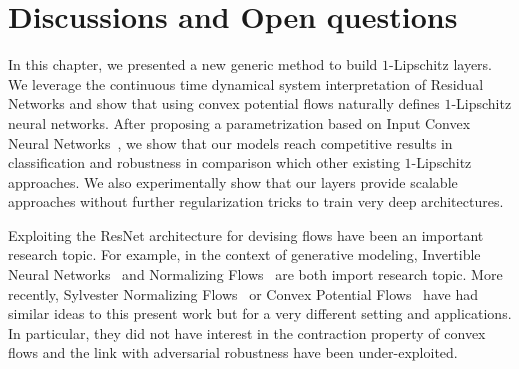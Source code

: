\section{Discussions and Open questions}
In this chapter, we presented a new generic method to build $1$-Lipschitz layers.
We leverage the continuous time dynamical system interpretation of Residual Networks and show that using convex potential flows naturally defines $1$-Lipschitz neural networks.
After proposing a parametrization based on Input Convex Neural Networks~\citep{amos2017input}, we  show that our models  reach competitive results in classification and robustness in comparison which other existing $1$-Lipschitz approaches.
We also experimentally show that our layers provide scalable approaches without further regularization tricks to train very deep architectures.

Exploiting the ResNet architecture for devising flows have been an important research topic.
For example, in the context of generative modeling, Invertible Neural Networks~\citep{behrmann2019invertible} and Normalizing Flows~\citep{rezende2015variational, verine2021expressivity} are both import research topic.
More recently, Sylvester Normalizing Flows~\citep{vdberg2018sylvester} or Convex Potential Flows~\citep{huang2021convex} have had similar ideas to this present work but for a very different setting and applications. In particular, they did not have interest in the contraction property of convex flows and the link with adversarial robustness have been under-exploited.


